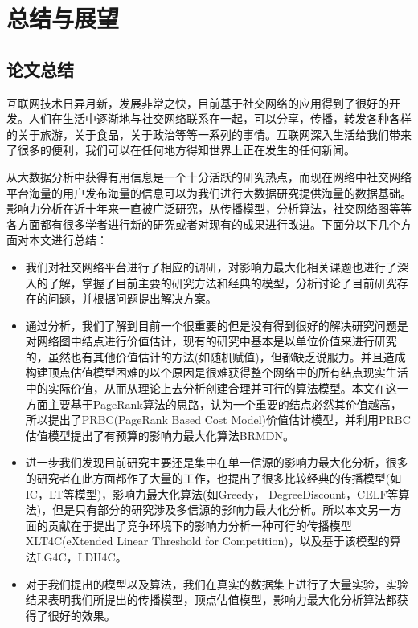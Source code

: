 

\chapter{总结与展望}
\label{cha:5thChap}

\section{论文总结}
互联网技术日异月新，发展非常之快，目前基于社交网络的应用得到了很好的开发。人们在生活中逐渐地与社交网络联系在一起，可以分享，传播，转发各种各样的关于旅游，关于食品，关于政治等等一系列的事情。互联网深入生活给我们带来了很多的便利，我们可以在任何地方得知世界上正在发生的任何新闻。

从大数据分析中获得有用信息是一个十分活跃的研究热点，而现在网络中社交网络平台海量的用户发布海量的信息可以为我们进行大数据研究提供海量的数据基础。影响力分析在近十年来一直被广泛研究，从传播模型，分析算法，社交网络图等等各方面都有很多学者进行新的研究或者对现有的成果进行改进。下面分以下几个方面对本文进行总结：
\begin{itemize}
\item 我们对社交网络平台进行了相应的调研，对影响力最大化相关课题也进行了深入的了解，掌握了目前主要的研究方法和经典的模型，分析讨论了目前研究存在的问题，并根据问题提出解决方案。
\item 通过分析，我们了解到目前一个很重要的但是没有得到很好的解决研究问题是对网络图中结点进行价值估计，现有的研究中基本是以单位价值来进行研究的，虽然也有其他价值估计的方法(如随机赋值)，但都缺乏说服力。并且造成构建顶点估值模型困难的以个原因是很难获得整个网络中的所有结点现实生活中的实际价值，从而从理论上去分析创建合理并可行的算法模型。本文在这一方面主要基于PageRank算法的思路，认为一个重要的结点必然其价值越高，所以提出了PRBC(PageRank Based Cost Model)价值估计模型，并利用PRBC估值模型提出了有预算的影响力最大化算法BRMDN。
\item 进一步我们发现目前研究主要还是集中在单一信源的影响力最大化分析，很多的研究者在此方面都作了大量的工作，也提出了很多比较经典的传播模型(如IC，LT等模型)，影响力最大化算法(如Greedy， DegreeDiscount，CELF等算法)，但是只有部分的研究涉及多信源的影响力最大化分析。所以本文另一方面的贡献在于提出了竞争环境下的影响力分析一种可行的传播模型XLT4C(eXtended Linear Threshold for Competition)，以及基于该模型的算法LG4C，LDH4C。
\item 对于我们提出的模型以及算法，我们在真实的数据集上进行了大量实验，实验结果表明我们所提出的传播模型，顶点估值模型，影响力最大化分析算法都获得了很好的效果。
\end{itemize}

